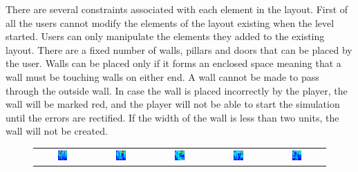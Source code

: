 There are several constraints associated with each element in the layout. First of all the users cannot modify the elements of the layout existing when the level started. Users can only manipulate the elements they added to the existing layout. There are a fixed number of walls, pillars and doors that can be placed by the user.  Walls can be placed only if it forms an enclosed space meaning that a wall must be touching walls on either end. A wall cannot be made to pass through the outside wall. In case the wall is placed incorrectly by the player, the wall will be marked red, and the player will not be able to start the simulation until the errors are rectified. If the width of the wall is less than two units, the wall will not be created.

\begin{figure}[ht] 
\centering
\begin{tabular}{c c c c c}
	\includegraphics[width=0.19\textwidth]{images/Hypothesis2/Iter1-ID-12_t_16_4175.png} & \includegraphics[width=0.19\textwidth]{images/Hypothesis2/Iter2-ID-8_t_13_695.png} & \includegraphics[width=0.19\textwidth]{images/Hypothesis2/Iter3-ID-22-t_11_1705.png} & \includegraphics[width=0.19\textwidth]{images/Hypothesis2/Iter4-ID-17-t_9_669.png} & \includegraphics[width=0.19\textwidth]{images/Hypothesis2/Iter6-ID-17-t_8_151.png} \\

\end{tabular}
\end{figure}
